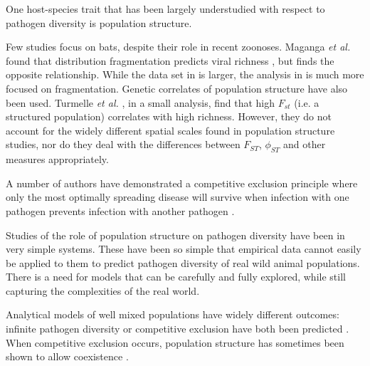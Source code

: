 One host-species trait that has been largely understudied with respect to pathogen diversity is population structure.


Few studies focus on bats, despite their role in recent zoonoses.
Maganga \emph{et al.} found that distribution fragmentation predicts viral richness \cite{maganga2014bat}, but \cite{gay2014parasite} finds the opposite relationship. 
While the data set in \cite{gay2014parasite} is larger, the analysis in \cite{maganga2014bat} is much more focused on fragmentation.
Genetic correlates of population structure have also been used.
Turmelle \emph{et al.} \cite{turmelle2009correlates}, in a small analysis, find that high $F_{st}$ (i.e. a structured population) correlates with high richness.
However, they do not account for the widely different spatial scales found in population structure studies, nor do they deal with the differences between $F_{ST}$, $\phi_{ST}$ and other measures appropriately. 



A number of authors have demonstrated a competitive exclusion principle where only the most optimally spreading disease will survive when infection with one pathogen prevents infection with another pathogen \cite{bremermann1989competitive, martcheva2013competitive, ackleh2003competitive, ackleh2014robust, turner2002impact, castillo1995dynamics}.


 

Studies of the role of population structure on pathogen diversity have been in very simple systems.
These have been so simple that empirical data cannot easily be applied to them to predict pathogen diversity of real wild animal populations.
There is a need for models that can be carefully and fully explored, while still capturing the complexities of the real world.

Analytical models of well mixed populations have widely different outcomes: infinite pathogen diversity \cite{may1994superinfection, ackleh2014robust} or competitive exclusion have both been predicted \cite{ackleh2003competitive, bremermann1989competitive, martcheva2013competitive, qiu2013vector, allen2004sis}.
When competitive exclusion occurs, population structure has sometimes been shown to allow coexistence \cite{qiu2013vector, allen2004sis, nunes2006localized}.

